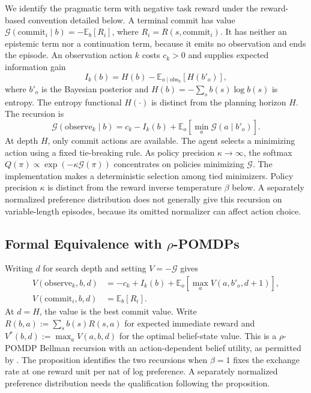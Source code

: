 \documentclass[manuscript, screen, review]{jair}
\begin{document}
We identify the pragmatic term with negative task reward under the reward-based convention detailed below. A terminal commit has value $\mathcal G(\mathrm{commit}_i\mid b)=-\mathbb E_b[R_i]$, where $R_i=R(s,\mathrm{commit}_i)$. It has neither an epistemic term nor a continuation term, because it emits no observation and ends the episode. An observation action $k$ costs $c_k>0$ and supplies expected information gain
\[
I_k(b)=H(b)-\mathbb E_{o\mid\mathrm{obs}_k}[H(b'_o)],
\]
where $b'_o$ is the Bayesian posterior and $H(b)=-\sum_s b(s)\log b(s)$ is entropy. The entropy functional $H(\cdot)$ is distinct from the planning horizon $H$. The recursion is
\begin{equation}
\mathcal G(\mathrm{observe}_k\mid b)=c_k-I_k(b)+\mathbb E_o\!\left[\min_a\mathcal G(a\mid b'_o)\right].
\label{eq:efe_recursive}
\end{equation}
At depth $H$, only commit actions are available. The agent selects a minimizing action using a fixed tie-breaking rule. As policy precision $\kappa\to\infty$, the softmax $Q(\pi)\propto\exp(-\kappa\mathcal G(\pi))$ concentrates on policies minimizing $\mathcal G$. The implementation makes a deterministic selection among tied minimizers. Policy precision $\kappa$ is distinct from the reward inverse temperature $\beta$ below. A separately normalized preference distribution does not generally give this recursion on variable-length episodes, because its omitted normalizer can affect action choice.

\subsection{Formal Equivalence with $\rho$-POMDPs}
\label{subsec:formal_rho_equiv}

Writing $d$ for search depth and setting $V=-\mathcal G$ gives
\begin{align}
V(\mathrm{observe}_k,b,d)&=-c_k+I_k(b)+\mathbb E_o\!\left[\max_a V(a,b'_o,d+1)\right],\label{eq:bellman_obs}\\
V(\mathrm{commit}_i,b,d)&=\mathbb E_b[R_i].\label{eq:bellman_commit}
\end{align}
At $d=H$, the value is the best commit value. Write $R(b,a):=\sum_s b(s)R(s,a)$ for expected immediate reward and $V^*(b,d):=\max_a V(a,b,d)$ for the optimal belief-state value. This is a $\rho$-POMDP Bellman recursion with an action-dependent belief utility, as permitted by \citet{araya2010}. The proposition identifies the two recursions when $\beta=1$ fixes the exchange rate at one reward unit per nat of log preference. A separately normalized preference distribution needs the qualification following the proposition.
\end{document}
